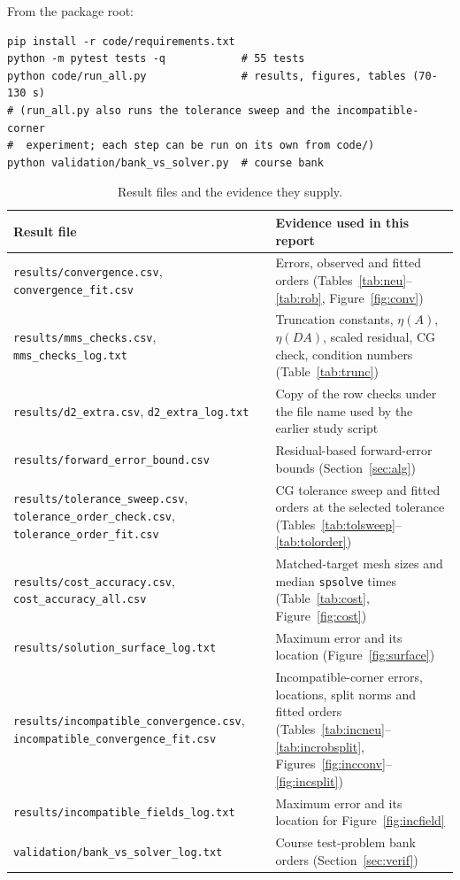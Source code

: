 \documentclass[11pt,a4paper]{article}
\theoremstyle{palplain}
\theoremstyle{paldef}
\theoremstyle{palremark}
\begin{document}
\noindent From the package root:
\begin{verbatim}
pip install -r code/requirements.txt
python -m pytest tests -q            # 55 tests
python code/run_all.py               # results, figures, tables (70-130 s)
# (run_all.py also runs the tolerance sweep and the incompatible-corner
#  experiment; each step can be run on its own from code/)
python validation/bank_vs_solver.py  # course bank
\end{verbatim}
\begin{table}[H]
\centering\small
\caption{Result files and the evidence they supply.}
\label{tab:provenance}
\begin{tabular}{@{}>{\raggedright\arraybackslash}p{}>{\raggedright\arraybackslash}p{}@{}}
\toprule
Result file & Evidence used in this report \\
\midrule
\texttt{results/convergence.csv}, \texttt{convergence\_fit.csv} & Errors, observed and fitted orders (Tables~\ref{tab:neu}--\ref{tab:rob}, Figure~\ref{fig:conv}) \\
\texttt{results/mms\_checks.csv}, \texttt{mms\_checks\_log.txt} & Truncation constants, $\eta(A)$, $\eta(DA)$, scaled residual, CG check, condition numbers (Table~\ref{tab:trunc}) \\
\texttt{results/d2\_extra.csv}, \texttt{d2\_extra\_log.txt} & Copy of the row checks under the file name used by the earlier study script \\
\texttt{results/forward\_error\_bound.csv} & Residual-based forward-error bounds (Section~\ref{sec:alg}) \\
\texttt{results/tolerance\_sweep.csv}, \texttt{tolerance\_order\_check.csv}, \texttt{tolerance\_order\_fit.csv} & CG tolerance sweep and fitted orders at the selected tolerance (Tables~\ref{tab:tolsweep}--\ref{tab:tolorder}) \\
\texttt{results/cost\_accuracy.csv}, \texttt{cost\_accuracy\_all.csv} & Matched-target mesh sizes and median \texttt{spsolve} times (Table~\ref{tab:cost}, Figure~\ref{fig:cost}) \\
\texttt{results/solution\_surface\_log.txt} & Maximum error and its location (Figure~\ref{fig:surface}) \\
\texttt{results/incompatible\_convergence.csv}, \texttt{incompatible\_convergence\_fit.csv} & Incompatible-corner errors, locations, split norms and fitted orders (Tables~\ref{tab:incneu}--\ref{tab:incrobsplit}, Figures~\ref{fig:incconv}--\ref{fig:incsplit}) \\
\texttt{results/incompatible\_fields\_log.txt} & Maximum error and its location for Figure~\ref{fig:incfield} \\
\texttt{validation/bank\_vs\_solver\_log.txt} & Course test-problem bank orders (Section~\ref{sec:verif}) \\
\bottomrule
\end{tabular}
\end{table}
\end{document}

